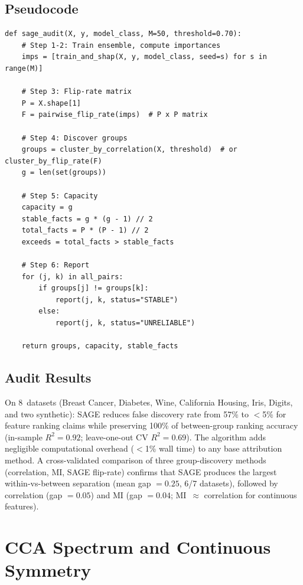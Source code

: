 \documentclass[11pt]{article}
\begin{document}
\subsection{Pseudocode}

\begin{verbatim}
def sage_audit(X, y, model_class, M=50, threshold=0.70):
    # Step 1-2: Train ensemble, compute importances
    imps = [train_and_shap(X, y, model_class, seed=s) for s in range(M)]

    # Step 3: Flip-rate matrix
    P = X.shape[1]
    F = pairwise_flip_rate(imps)  # P x P matrix

    # Step 4: Discover groups
    groups = cluster_by_correlation(X, threshold)  # or cluster_by_flip_rate(F)
    g = len(set(groups))

    # Step 5: Capacity
    capacity = g
    stable_facts = g * (g - 1) // 2
    total_facts = P * (P - 1) // 2
    exceeds = total_facts > stable_facts

    # Step 6: Report
    for (j, k) in all_pairs:
        if groups[j] != groups[k]:
            report(j, k, status="STABLE")
        else:
            report(j, k, status="UNRELIABLE")

    return groups, capacity, stable_facts
\end{verbatim}

\subsection{Audit Results}

On 8~datasets (Breast Cancer, Diabetes, Wine, California Housing, Iris, Digits, and two synthetic): SAGE reduces false discovery rate from 57\% to $<$5\% for feature ranking claims while preserving 100\% of between-group ranking accuracy (in-sample $R^2 = 0.92$; leave-one-out CV $R^2 = 0.69$).  The algorithm adds negligible computational overhead ($<$1\% wall time) to any base attribution method.  A cross-validated comparison of three group-discovery methods (correlation, MI, SAGE flip-rate) confirms that SAGE produces the largest within-vs-between separation (mean gap $= 0.25$, 6/7 datasets), followed by correlation (gap $= 0.05$) and MI (gap $= 0.04$; MI~$\approx$ correlation for continuous features).

\section{CCA Spectrum and Continuous Symmetry}
\end{document}
